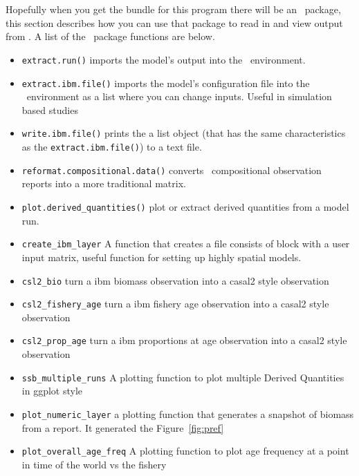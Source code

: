 \section{ \label{sec:post-processing}}

Hopefully when you get the bundle for this program there will be an \R\ package, this section describes how you can use that package to read in and view output from \IBM.  A list of the \R\ package functions are below.

\begin{itemize}
	\item \texttt{extract.run()} imports the model's output into the \R\ environment.
	\item \texttt{extract.ibm.file()} imports the model's configuration file into the \R\ environment as a list where you can change inputs. Useful in simulation based studies
	\item \texttt{write.ibm.file()} prints the a list object (that has the same characteristics as the \texttt{extract.ibm.file()})	to a text file.
	\item \texttt{reformat.compositional.data()} converts \IBM\ compositional observation reports into a more traditional matrix.
	\item \texttt{plot.derived\_quantities()} plot or extract derived quantities from a model run.
	\item \texttt{create\_ibm\_layer} A function that creates a file consists of  block with a user input matrix, useful function for setting up highly spatial models.
	\item \texttt{csl2\_bio} turn a ibm biomass observation into a casal2 style observation
	\item \texttt{csl2\_fishery\_age} turn a ibm fishery age observation into a casal2 style observation	
	\item \texttt{csl2\_prop\_age} turn a ibm proportions at age observation into a casal2 style observation
	\item \texttt{ssb\_multiple\_runs} A plotting function to plot multiple Derived Quantities in ggplot style
	\item \texttt{plot\_numeric\_layer} a plotting function that generates a snapshot of biomass from a  report. It generated the Figure~\ref{fig:pref}
	\item \texttt{plot\_overall\_age\_freq} A plotting function to plot age frequency at a point in time of the world vs the fishery
\end{itemize}



